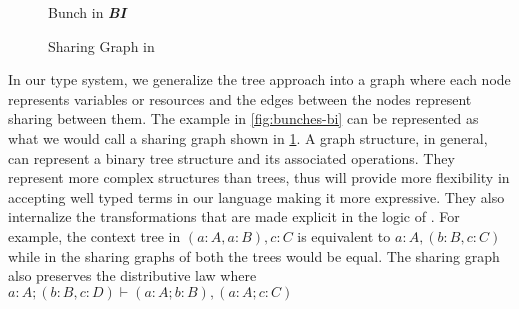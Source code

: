 \begin{figure}[h]
  \begin{framed}
  \begin{minipage}[c]{0.45\linewidth}
  \centering
    \caption{Bunch in \textbf{\em BI}}
    \label{fig:bunches-bi}
  \end{minipage}\hfill%
  \begin{minipage}[c]{0.45\linewidth}
  \centering
    \caption{Sharing Graph in \qub{}}
    \label{fig:sharing-graph}
  \end{minipage}
\end{framed}
\end{figure}

In our type system, we generalize the tree approach into a graph where each node represents variables or resources
and the edges between the nodes represent sharing between them. The example in \cref{fig:bunches-bi} can
be represented as what we would call a sharing graph shown in \cref{fig:sharing-graph}. A graph structure, in general,
can represent a binary tree structure and its associated operations. They represent more complex structures than
trees, thus will provide more flexibility in accepting well typed terms in our language making it more expressive.
They also internalize the transformations that are made explicit in the logic of \BI{}. For example, the context tree in \BI{}
$(a:A, a:B), c:C$ is equivalent to $a:A, (b: B, c:C)$ while in \qub{} the sharing graphs of both the trees would be equal.
The sharing graph also preserves the distributive law where $a:A;(b:B,c:D) \vdash (a:A;b:B),(a:A;c:C)$


